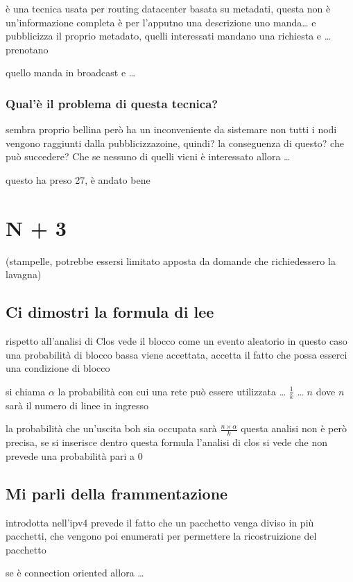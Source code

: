 \documentclass[11pt]{article}
\begin{document}
è una tecnica usata per routing datacenter basata su metadati, questa non è un'informazione completa è per l'apputno una descrizione
uno manda\ldots{} e pubblicizza il proprio metadato, quelli interessati mandano una richiesta e \ldots{} prenotano

quello manda in broadcast e \ldots{}

\subsubsection{Qual'è il problema di questa tecnica?}
\label{sec:orgcc9fd8b}
sembra proprio bellina però ha un inconveniente da sistemare
non tutti i nodi vengono raggiunti dalla pubblicizzazoine, quindi?
la conseguenza di questo? che può succedere? Che se nessuno di quelli vicni è interessato allora \ldots{}

questo ha preso 27, è andato bene

\section{N + 3}
\label{sec:org1774da4}
(stampelle, potrebbe essersi limitato apposta da domande che richiedessero la lavagna)
\subsection{Ci dimostri la formula di lee}
\label{sec:orgb61171f}
rispetto all'analisi di Clos vede il blocco come un evento aleatorio
in questo caso una probabilità di blocco bassa viene accettata, accetta il fatto che possa esserci una condizione di blocco

si chiama \(\alpha\) la probabilità con cui una rete può essere utilizzata \ldots{} \(\frac{1}{k}\) \ldots{} \(n\) dove \(n\) sarà il numero di linee in ingresso

la probabilità che un'uscita boh sia occupata sarà \(\frac{n \times \alpha}{k}\)
questa analisi non è però precisa, se si inserisce dentro questa formula l'analisi di clos si vede che non prevede una probabilità pari a \(0\)

\subsection{Mi parli della frammentazione}
\label{sec:org844d3ad}
introdotta nell'ipv4
prevede il fatto che un pacchetto venga diviso in più pacchetti, che vengono poi enumerati per permettere la ricostruizione del pacchetto

se è connection oriented allora \ldots{}
\end{document}

